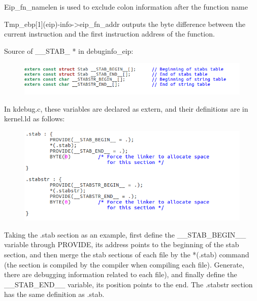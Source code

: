 Eip\_fn\_namelen is used to exclude colon information after the function name

Tmp\_ebp[1](eip)-info->eip\_fn\_addr outputs the byte difference between the current instruction and the first instruction address of the function.

Source of \_\_STAB\_ * in debuginfo\_eip:

\begin{figure}[H]
  \centering
  \includegraphics[width=0.8\linewidth]{figure/challenge_4}
\end{figure}


In kdebug.c, these variables are declared as extern, and their definitions are in kernel.ld as follows:

\begin{figure}[H]
  \centering
  \includegraphics[width=0.8\linewidth]{figure/challenge_5}
\end{figure}

Taking the .stab section as an example, first define the \_\_STAB\_BEGIN\_\_ variable through PROVIDE, its address points to the beginning of the stab section, and then merge the stab sections of each file by the *(.stab) command (the section is compiled by the compiler when compiling each file). Generate, there are debugging information related to each file), and finally define the \_\_STAB\_END\_\_ variable, its position points to the end. The .stabstr section has the same definition as .stab.


